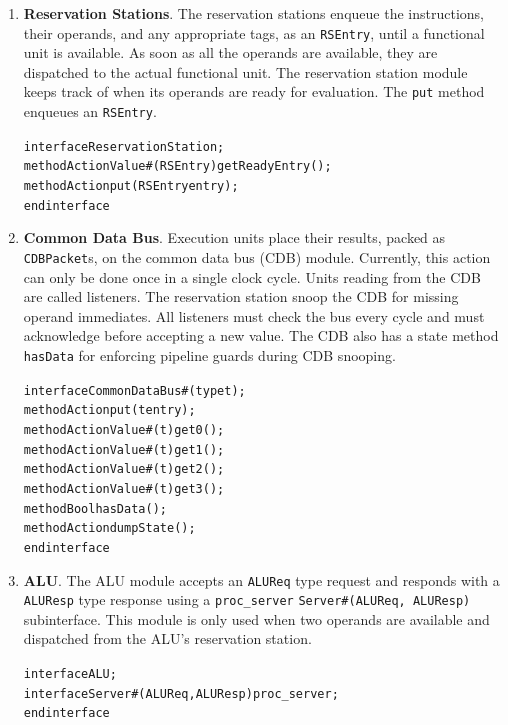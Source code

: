 \documentclass[12pt]{article}
\begin{document}
\begin{enumerate}

    \item \textbf{Reservation Stations}. The reservation stations enqueue the instructions, their operands, and any
appropriate tags, as an \verb=RSEntry=, until a functional unit is available.
As soon as all the operands are available, they are dispatched to the actual
functional unit. The reservation station module keeps track of when its
operands are ready for evaluation. The \verb=put= method enqueues an
\verb=RSEntry=.
    \begin{alltt}
        interface ReservationStation;
          method ActionValue#(RSEntry) getReadyEntry();
          method Action put(RSEntry entry);
        endinterface
    \end{alltt}
    
    \item \textbf{Common Data Bus}. Execution units place their results, packed as \verb=CDBPacket=s, on the
common data bus (CDB) module. Currently, this action can only be done once in
a single clock cycle. Units reading from the CDB are called listeners. The
reservation station snoop the CDB for missing operand immediates. All
listeners must check the bus every cycle and must acknowledge before accepting
a new value. The CDB also has a state method \verb=hasData= for enforcing
pipeline guards during CDB snooping.
    \begin{alltt}
        interface CommonDataBus#(type t);
          method Action put(t entry);
          method ActionValue#(t) get0();
          method ActionValue#(t) get1();
          method ActionValue#(t) get2();
          method ActionValue#(t) get3();
          method Bool hasData();
          method Action dumpState();
        endinterface
    \end{alltt}
    
    \item \textbf{ALU}. The ALU module accepts an \verb=ALUReq= type request and responds with a \verb=ALUResp= type response using a \verb=proc_server= 
\verb=Server#(ALUReq, ALUResp)= subinterface. This module is only used when two operands are available and dispatched from the ALU's reservation station.
    \begin{alltt}
        interface ALU;
            interface Server#(ALUReq, ALUResp) proc_server;
        endinterface
    \end{alltt}
    

\end{enumerate}
\end{document}
